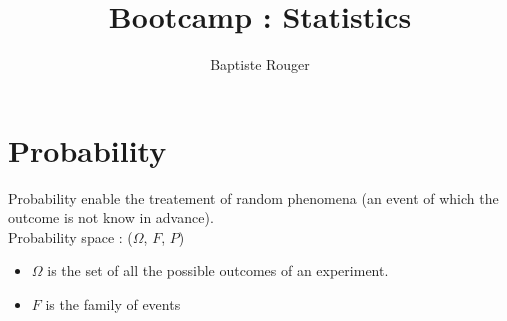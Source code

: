 \documentclass[10pt,a4paper]{article}
\author{Baptiste Rouger}
\title{Bootcamp : Statistics}
\begin{document}
\maketitle

\begin{flushright}
\end{flushright}

\tableofcontents

\newpage

\part{Probability}

Probability enable the treatement of random phenomena (an event of which the outcome is not know in advance).\\
Probability space : ($\Omega$, $F$, $P$)\\
\begin{itemize}
  \item $\Omega$ is the set of all the possible outcomes of an experiment.
  \item $F$ is the family of events
\end{itemize}
\end{document}
